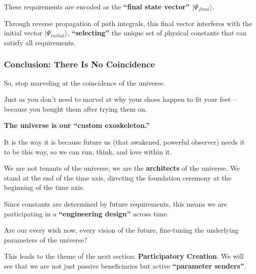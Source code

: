 These requirements are encoded as the \textbf{``final state vector'' $|\Psi_{final}\rangle$}.

Through reverse propagation of path integrals, this final vector interferes with the initial vector $|\Psi_{initial}\rangle$, \textbf{``selecting''} the unique set of physical constants that can satisfy all requirements.

\subsubsection{Conclusion: There Is No Coincidence}

So, stop marveling at the coincidence of the universe.

Just as you don't need to marvel at why your shoes happen to fit your feet---because you bought them after trying them on.

\textbf{The universe is our ``custom exoskeleton.''}

It is the way it is because future us (that awakened, powerful observer) needs it to be this way, so we can run, think, and love within it.

We are not tenants of the universe; we are the \textbf{architects} of the universe. We stand at the end of the time axis, directing the foundation ceremony at the beginning of the time axis.

Since constants are determined by future requirements, this means we are participating in a \textbf{``engineering design''} across time.

Are our every wish now, every vision of the future, fine-tuning the underlying parameters of the universe?

This leads to the theme of the next section: \textbf{Participatory Creation}. We will see that we are not just passive beneficiaries but active \textbf{``parameter senders''}.

